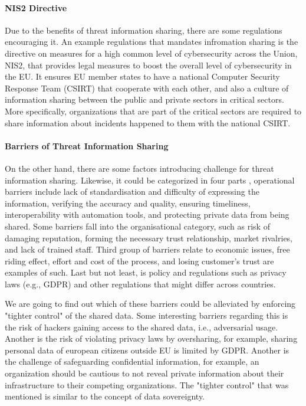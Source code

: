 \documentclass{article}
\begin{document}
\paragraph{NIS2 Directive}
Due to the benefits of threat information sharing, there are some regulations encouraging it.
An example regulations that mandates infromation sharing is the directive on measures for a high common level of cybersecurity across the Union, NIS2, that provides legal measures to boost the overall level of cybersecurity in the EU. It ensures EU member states to have a national Computer Security Response Team (CSIRT) that cooperate with each other, and also a culture of information sharing between the public and private sectors in critical sectors. More specifically, organizations that are part of the critical sectors are required to share information about incidents happened to them with the national CSIRT.

\paragraph*{Barriers of Threat Information Sharing}
On the other hand, there are some factors introducing challenge for threat information sharing. Likewise, it could be categorized in four parts \cite{zibak_cyber_2019}, 
operational barriers include lack of standardisation and difficulty of expressing the information, verifying the accuracy and quality, ensuring timeliness, interoperability with automation tools, and protecting private data from being shared. 
Some barriers fall into the organisational category, such as risk of damaging reputation, forming the necessary trust relationship, market rivalries, and lack of trained staff. Third group of barriers relate to economic issues, free riding effect, effort and cost of the process, and losing customer's trust are examples of such. Last but not least, is policy and regulations such as privacy laws (e.g., GDPR) and other regulations that might differ across countries.

We are going to find out which of these barriers could be alleviated by enforcing "tighter control" of the shared data. Some interesting barriers regarding this is the risk of hackers gaining access to the shared data, i.e., adversarial usage. Another is the risk of violating privacy laws by oversharing, for example, sharing personal data of european citizens outside EU is limited by GDPR. Another is the challenge of safeguarding confidential information, for example, an organization should be cautious to not reveal private information about their infrastructure to their competing organizations. The "tighter control" that was mentioned is similar to the concept of data sovereignty.
\end{document}
